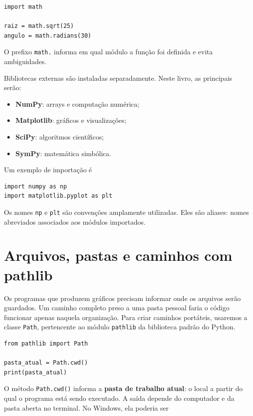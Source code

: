 \begin{lstlisting}
import math

raiz = math.sqrt(25)
angulo = math.radians(30)
\end{lstlisting}

O prefixo \texttt{math.} informa em qual módulo a função foi definida e evita ambiguidades.

Bibliotecas externas são instaladas separadamente. Neste livro, as principais serão:

\begin{itemize}
  \item \textbf{NumPy}: arrays e computação numérica;
  \item \textbf{Matplotlib}: gráficos e visualizações;
  \item \textbf{SciPy}: algoritmos científicos;
  \item \textbf{SymPy}: matemática simbólica.
\end{itemize}

Um exemplo de importação é

\begin{lstlisting}
import numpy as np
import matplotlib.pyplot as plt
\end{lstlisting}

Os nomes \texttt{np} e \texttt{plt} são convenções amplamente utilizadas. Eles são aliases: nomes abreviados associados aos módulos importados.

\section{Arquivos, pastas e caminhos com pathlib}
\label{sec:pathlib}

Os programas que produzem gráficos precisam informar onde os arquivos serão guardados. Um caminho completo preso a uma pasta pessoal faria o código funcionar apenas naquela organização. Para criar caminhos portáteis, usaremos a classe \texttt{Path}, pertencente ao módulo \texttt{pathlib} da biblioteca padrão do Python.

\begin{lstlisting}
from pathlib import Path

pasta_atual = Path.cwd()
print(pasta_atual)
\end{lstlisting}

O método \texttt{Path.cwd()} informa a \textbf{pasta de trabalho atual}: o local a partir do qual o programa está sendo executado. A saída depende do computador e da pasta aberta no terminal. No Windows, ela poderia ser

